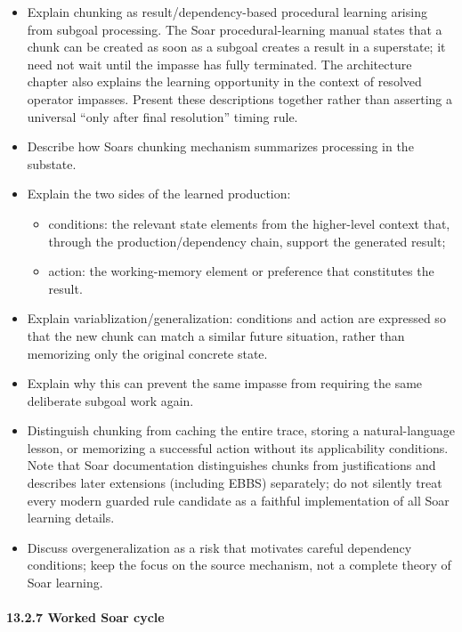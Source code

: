 \begin{itemize}
\tightlist
\item
  Explain chunking as result/dependency-based procedural learning arising from subgoal processing. The Soar procedural-learning manual states that a chunk can be created as soon as a subgoal creates a result in a superstate; it need not wait until the impasse has fully terminated. The architecture chapter also explains the learning opportunity in the context of resolved operator impasses. Present these descriptions together rather than asserting a universal ``only after final resolution'' timing rule.
\item
  Describe how Soar\textquotesingle s chunking mechanism summarizes processing in the substate.
\item
  Explain the two sides of the learned production:

  \begin{itemize}
  \tightlist
  \item
    conditions: the relevant state elements from the higher-level context that, through the production/dependency chain, support the generated result;
  \item
    action: the working-memory element or preference that constitutes the result.
  \end{itemize}
\item
  Explain variablization/generalization: conditions and action are expressed so that the new chunk can match a similar future situation, rather than memorizing only the original concrete state.
\item
  Explain why this can prevent the same impasse from requiring the same deliberate subgoal work again.
\item
  Distinguish chunking from caching the entire trace, storing a natural-language lesson, or memorizing a successful action without its applicability conditions. Note that Soar documentation distinguishes chunks from justifications and describes later extensions (including EBBS) separately; do not silently treat every modern guarded rule candidate as a faithful implementation of all Soar learning details.
\item
  Discuss overgeneralization as a risk that motivates careful dependency conditions; keep the focus on the source mechanism, not a complete theory of Soar learning.
\end{itemize}

\paragraph{13.2.7 Worked Soar cycle}\label{1327-worked-soar-cycle}

